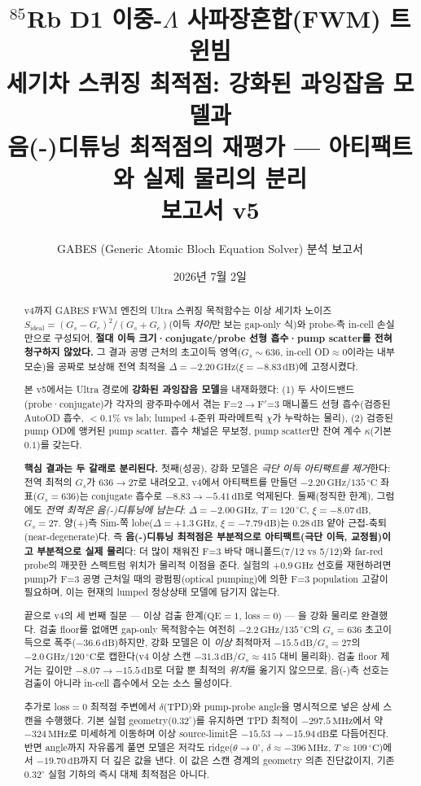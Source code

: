 \documentclass[11pt,a4paper]{article}
\title{\textbf{$^{85}$Rb D1 이중-$\Lambda$ 사파장혼합(FWM) 트윈빔\\
세기차 스퀴징 최적점: 강화된 과잉잡음 모델과\\
음(-)디튜닝 최적점의 재평가 --- 아티팩트와 실제 물리의 분리}\\[4pt]
\large 보고서 v5}
\author{GABES (Generic Atomic Bloch Equation Solver) 분석 보고서}
\date{2026년 7월 2일}
\newcommand{\dB}{\,\mathrm{dB}}
\newcommand{\GHz}{\,\mathrm{GHz}}
\newcommand{\MHz}{\,\mathrm{MHz}}
\newcommand{\degC}{\,^{\circ}\mathrm{C}}
\begin{document}
\maketitle

\begin{abstract}
\noindent
v4까지 GABES FWM 엔진의 Ultra 스퀴징 목적함수는 이상 세기차 노이즈
$S_{\mathrm{ideal}}=(G_s-G_c)^2/(G_s+G_c)$(이득 \emph{차이}만 보는 gap-only 식)와
probe-측 in-cell 손실만으로 구성되어, \textbf{절대 이득 크기·conjugate/probe 선형
흡수·pump scatter를 전혀 청구하지 않았다.} 그 결과 공명 근처의 초고이득
영역($G_s\sim636$, in-cell OD$\approx0$이라는 내부 모순)을 공짜로 보상해 전역 최적을
$\Delta=-2.20\GHz$($\xi=-8.83\dB$)에 고정시켰다.

본 v5에서는 Ultra 경로에 \textbf{강화된 과잉잡음 모델}을 내재화했다: (1) 두
사이드밴드(probe·conjugate)가 각자의 광주파수에서 겪는 F=2$\to$F$'$=3 매니폴드
선형 흡수(검증된 AutoOD 흡수, $<0.1\%$ vs lab; lumped 4-준위 파라메트릭 $\chi$가
누락하는 물리), (2) 검증된 pump OD에 앵커된 pump scatter. 흡수 채널은 무보정,
pump scatter만 잔여 계수 $\kappa$(기본 $0.1$)를 갖는다.

\textbf{핵심 결과는 두 갈래로 분리된다.} 첫째(성공), 강화 모델은 \emph{극단
이득 아티팩트를 제거}한다: 전역 최적의 $G_s$가 $636\to27$로 내려오고, v4에서
아티팩트를 만들던 $-2.20\GHz/135\degC$ 좌표($G_s=636$)는 conjugate 흡수로
$-8.83\to-5.41\dB$로 억제된다. 둘째(정직한 한계), 그럼에도 \emph{전역 최적은
음(-)디튜닝에 남는다}: $\Delta=-2.00\GHz$, $T=120\degC$, $\xi=-8.07\dB$,
$G_s=27$. 양(+)측 Sim-쪽 lobe($\Delta=+1.3\GHz$, $\xi=-7.79\dB$)는 $0.28\dB$
얕아 근접-축퇴(near-degenerate)다. 즉 \textbf{음(-)디튜닝 최적점은 부분적으로
아티팩트(극단 이득, 교정됨)이고 부분적으로 실제 물리}다: 더 많이 채워진 F=3
바닥 매니폴드(7/12 vs 5/12)와 far-red probe의 깨끗한 스펙트럼 위치가 물리적
이점을 준다. 실험의 $+0.9\GHz$ 선호를 재현하려면 pump가 F=3 공명 근처일 때의
광펌핑(optical pumping)에 의한 F=3 population 고갈이 필요하며, 이는 현재의 lumped
정상상태 모델에 담기지 않는다.

끝으로 v4의 세 번째 질문 --- 이상 검출 한계($\mathrm{QE}=1$, loss$=0$) --- 을 강화
물리로 완결했다. 검출 floor를 없애면 gap-only 목적함수는 여전히
$-2.2\GHz/135\degC$의 $G_s=636$ 초고이득으로 폭주($-36.6\dB$)하지만, 강화 모델은
이 \emph{이상} 최적마저 $-15.5\dB$/$G_s=27$의 $-2.0\GHz/120\degC$로 캡한다(v4 이상
스캔 $-31.3\dB$/$G_s\approx415$ 대비 물리화). 검출 floor 제거는 깊이만
$-8.07\to-15.5\dB$로 더할 뿐 최적의 \emph{위치}를 옮기지 않으므로, 음(-)측 선호는
검출이 아니라 in-cell 흡수에서 오는 소스 물성이다.

추가로 loss$=0$ 최적점 주변에서 $\delta$(TPD)와 pump-probe angle을 명시적으로
넣은 상세 스캔을 수행했다. 기본 실험 geometry($0.32^\circ$)를 유지하면 TPD 최적이
$-297.5\MHz$에서 약 $-324\MHz$로 미세하게 이동하며 이상 source-limit은
$-15.53\to-15.94\dB$로 다듬어진다. 반면 angle까지 자유롭게 풀면 모델은
저각도 ridge($\theta\to0^\circ$, $\delta\approx-396\MHz$, $T\approx109\degC$)에서
$-19.70\dB$까지 더 깊은 값을 낸다. 이 값은 스캔 경계의 geometry 의존 진단값이지,
기존 $0.32^\circ$ 실험 기하의 즉시 대체 최적점은 아니다.
\end{abstract}
\end{document}
